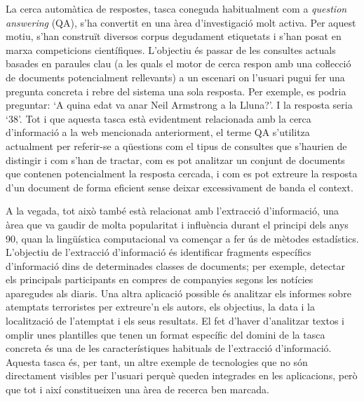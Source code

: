 \begin{multicols}{2}
La cerca automàtica de respostes, tasca coneguda habitualment com a \textit{question answering} (QA), s’ha convertit en una àrea d’investigació molt activa. Per aquest motiu, s’han construït diversos corpus degudament etiquetats i s’han posat en marxa competicions científiques. L’objectiu és passar de les consultes actuals basades en paraules clau (a les quals el motor de cerca respon amb una coŀlecció de documents potencialment rellevants) a un escenari on l’usuari pugui fer una pregunta concreta i rebre del sistema una sola resposta. Per exemple, es podria preguntar: ‘A quina edat va anar Neil Armstrong a la Lluna?’. I la resposta seria ‘38’. Tot i que aquesta tasca està evidentment relacionada amb la cerca d’informació a la web mencionada anteriorment, el terme QA s’utilitza actualment per referir-se a qüestions com el tipus de consultes que s’haurien de distingir i com s’han de tractar, com es pot analitzar un conjunt de documents que contenen potencialment la resposta cercada, i com es pot extreure la resposta d’un document de forma eficient sense deixar excessivament de banda el context.

A la vegada, tot això també està relacionat amb l’extracció d’informació, una àrea que va gaudir de molta popularitat i influència durant el principi dels anys 90, quan la lingüística computacional va començar a fer ús de mètodes estadístics. L’objectiu de l’extracció d’informació és identificar fragments específics d’informació dins de determinades classes de documents; per exemple, detectar els principals participants en compres de companyies segons les notícies aparegudes als diaris. Una altra aplicació possible és analitzar els informes sobre atemptats terroristes per extreure’n els autors, els objectius, la data i la localització de l’atemptat i els seus resultats. El fet d’haver d’analitzar textos i omplir unes plantilles que tenen un format específic del domini de la tasca concreta és una de les característiques habituals de l’extracció d’informació. Aquesta tasca és, per tant, un altre exemple de tecnologies que no són directament visibles per l’usuari perquè queden integrades en les aplicacions, però que tot i així constitueixen una àrea de recerca ben marcada.


\end{multicols}
